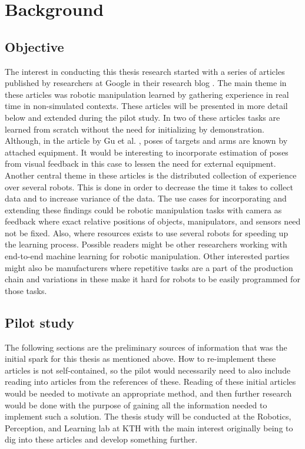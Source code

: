 \section{Background}

\subsection{Objective}

The interest in conducting this thesis research started with a series of
articles published by researchers at Google in their research blog
\cite{gu2016deep,finn2016deep,yahya2016collective,chebotar2016path}. The main
theme in these articles was robotic manipulation learned by gathering
experience in real time in non-simulated contexts. These articles will be
presented in more detail below and extended during the pilot study. In two of
these articles \cite{gu2016deep,finn2016deep} tasks are learned from scratch
without the need for initializing by demonstration. Although, in the article by
Gu et al. \cite{gu2016deep}, poses of targets and arms are known by attached
equipment. It would be interesting to incorporate estimation of poses from
visual feedback in this case to lessen the need for external equipment. Another
central theme in these articles is the distributed collection of experience
over several robots. This is done in order to decrease the time it takes to
collect data and to increase variance of the data. The use cases for
incorporating and extending these findings could be robotic manipulation tasks
with camera as feedback where exact relative positions of objects,
manipulators, and sensors need not be fixed. Also, where resources exists to
use several robots for speeding up the learning process. Possible readers might
be other researchers working with end-to-end machine learning for robotic
manipulation. Other interested parties might also be manufacturers where
repetitive tasks are a part of the production chain and variations in these
make it hard for robots to be easily programmed for those tasks.

\subsection{Pilot study}

The following sections are the preliminary sources of information that was the
initial spark for this thesis as mentioned above. How to re-implement these
articles is not self-contained, so the pilot would necessarily need to also
include reading into articles from the references of these. Reading of these
initial articles would be needed to motivate an appropriate method, and then
further research would be done with the purpose of gaining all the information
needed to implement such a solution. The thesis study will be conducted at the
Robotics, Perception, and Learning lab at KTH with the main interest originally
being to dig into these articles and develop something further.

